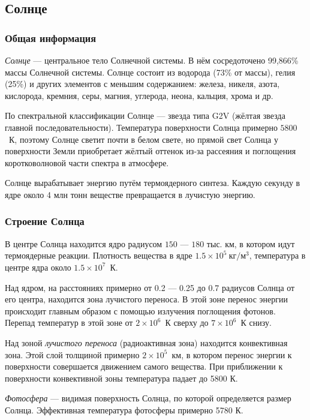 \subsection{Солнце}
\subsubsection*{Общая информация}

\textit{Солнце} --- центральное тело Солнечной системы. В нём сосредоточено 99,866\%  массы Солнечной системы. Солнце состоит из водорода (73\% от массы), гелия (25\%) и других элементов с меньшим содержанием: железа, никеля, азота, кислорода, кремния, серы, магния, углерода, неона, кальция, хрома и др.

По спектральной классификации Солнце --- звезда типа G2V (жёлтая звезда главной последовательности). Температура поверхности Солнца  примерно $5 800$~К, поэтому Солнце светит почти в белом свете, но прямой свет Солнца у поверхности Земли приобретает жёлтый оттенок из-за рассеяния и поглощения коротковолновой части спектра в атмосфере.

Солнце вырабатывает энергию путём термоядерного синтеза. Каждую секунду в ядре около 4 млн тонн веществе превращается в лучистую энергию.

\subsubsection*{Строение Солнца}

В центре Солнца находится ядро радиусом $150 $ --- $ 180$ тыс. км, в котором идут термоядерные реакции. Плотность  вещества в ядре $1.5\times 10^5~\text{кг}/\text{м}^3$, температура в центре ядра около $1.5\times 10^7$~К.

Над ядром, на расстояниях примерно от 0.2 --- 0.25 до 0.7 радиусов Солнца от его центра, находится зона лучистого переноса. В этой зоне перенос энергии происходит главным образом с помощью  излучения поглощения фотонов. Перепад температур в этой зоне от $2\times10^6$~К сверху до $7\times10^6$~К снизу.

Над зоной \textit{лучистого  переноса} (радиоактивная зона) находится конвективная зона. Этой слой толщиной примерно $2\times10^5$~км, в котором перенос энергии к поверхности совершается движением самого вещества. При приближении к поверхности конвективной зоны температура падает до 5800 К.

\textit{Фотосфера} --- видимая поверхность Солнца, по которой определяется размер Солнца. Эффективная температура фотосферы примерно 5780 К.

